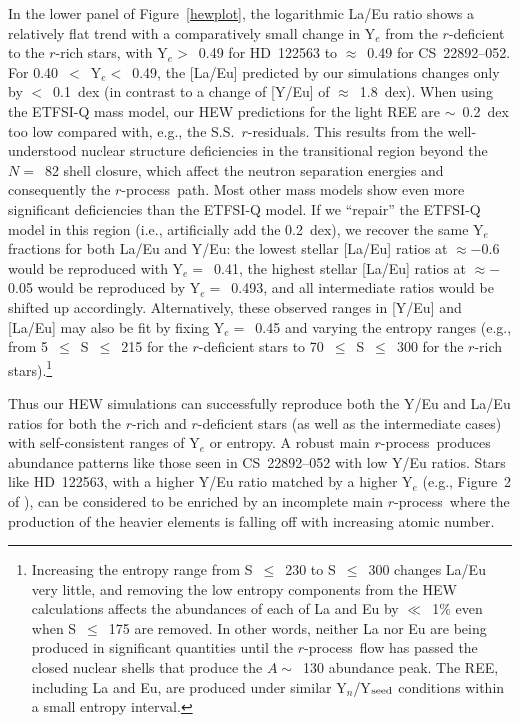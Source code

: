 \documentclass{emulateapj}
\def\rpro{\mbox{$r$-process}}
\begin{document}
In the lower panel of Figure~\ref{hewplot}, 
the logarithmic La/Eu ratio shows a relatively flat trend with
a comparatively small change in Y$_e$ from the 
$r$-deficient to the $r$-rich stars,
with Y$_e >$~0.49 for \mbox{HD~122563} to
$\approx$~0.49 for \mbox{CS~22892--052}.
For 0.40~$<$~Y$_e <$~0.49, the [La/Eu] predicted
by our simulations changes only by $<$~0.1~dex
(in contrast to a change of [Y/Eu] of $\approx$~1.8~dex).
When using the ETFSI-Q mass model, our HEW predictions for
the light REE are $\sim$~0.2~dex too low compared with,
e.g., the \citet{arlandini99}
S.S.\ $r$-residuals.
This results from the well-understood nuclear structure deficiencies
in the transitional region beyond the $N =$~82 shell closure, which
affect the neutron separation energies and consequently the
\rpro\ path.
Most other mass models show even more significant deficiencies
than the ETFSI-Q model.
If we ``repair'' the ETFSI-Q model in this
region (i.e., artificially add the 0.2~dex), we recover the
same Y$_e$ fractions for both La/Eu and Y/Eu:
the lowest stellar [La/Eu] ratios at $\approx -$0.6 would be reproduced
with Y$_e =$~0.41, the highest stellar [La/Eu] ratios at 
$\approx -$0.05 would be reproduced by Y$_e =$~0.493, and all intermediate
ratios would be shifted up accordingly.
Alternatively, these observed ranges in 
[Y/Eu] and [La/Eu] may also be fit by fixing Y$_e =$~0.45 
and varying the entropy ranges
(e.g., from 5~$\leq$~S~$\leq$~215 for the $r$-deficient stars
to 70~$\leq$~S~$\leq$~300 for the $r$-rich stars).\footnote{
Increasing the entropy range from S~$\leq$~230
to S~$\leq$~300 changes La/Eu 
very little, and removing the low entropy components from the HEW
calculations affects the abundances of each of La and Eu by $\ll$~1\%
even when S~$\leq$~175 are removed.
In other words, neither La nor Eu are being produced in significant
quantities until the \rpro\ flow has passed the closed nuclear shells
that produce the $A \sim$~130 abundance peak.
The REE, including La and Eu, are 
produced under similar Y$_n$/Y$_{\rm seed}$ conditions
within a small entropy interval.}

Thus our HEW simulations 
can successfully reproduce both the Y/Eu and La/Eu ratios
for both the $r$-rich and $r$-deficient stars 
(as well as the intermediate cases)
with self-consistent ranges of Y$_e$ or entropy.
A robust main \rpro\ produces abundance patterns like those
seen in \mbox{CS~22892--052} with low Y/Eu ratios.
Stars like \mbox{HD~122563}, with a higher Y/Eu ratio matched by
a higher Y$_e$ (e.g., Figure~2 of \citealt{kratz08a}),
can be considered to be enriched by an incomplete main \rpro\ 
where the production
of the heavier elements is falling off with increasing atomic number.
\end{document}
